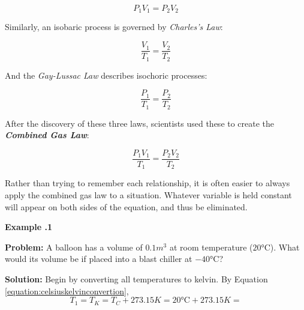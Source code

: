 	\begin{mdframed}[backgroundcolor=orange!20!white]
		\begin{equation}
			P_1 V_1 = P_2 V_2
			\label{equation:boyleslaw}
		\end{equation}
	\end{mdframed}	

Similarly, an isobaric process is governed by \textit{Charles's Law}: 
	\begin{mdframed}[backgroundcolor=orange!20!white]
	\begin{equation}
		\frac{V_1}{T_1} = \frac{V_2}{T_2}
		\label{equation:charleslaw}
	\end{equation}
\end{mdframed}	

And the \textit{Gay-Lussac Law} describes isochoric processes: 
\begin{mdframed}[backgroundcolor=orange!20!white]
	\begin{equation}
		\frac{P_1}{T_1} = \frac{P_2}{T_2}
		\label{equation:gaylussaclaw}
	\end{equation}
\end{mdframed}	

After the discovery of these three laws, scientists used these to create the \textbf{\textit{Combined Gas Law}}: 
\begin{mdframed}[backgroundcolor=orange!20!white]
	\begin{equation}
		\frac{P_1V_1}{T_1} = \frac{P_2V_2}{T_2}
		\label{equation:combinedgaslaw}
	\end{equation}
\end{mdframed}

Rather than trying to remember each relationship, it is often easier to always apply the combined gas law to a situation.  Whatever variable is held constant will appear on both sides of the equation, and thus be eliminated.  



\begin{mdframed}[backgroundcolor=blue!10!white]
	\begin{center}
		
		
		\textbf{Example \thesection.1}	
	\end{center}
	
	\textbf{Problem: }A balloon has a volume of $0.1 \si{m^3}$ at room temperature ($20\si{\degreeCelsius}$).  What would its volume be if placed into a blast chiller at $-40\si{\degreeCelsius}$?  
	
	
	\vspace{0.1in}
	
	\textbf{Solution:} Begin by converting all temperatures to kelvin. By Equation \ref{equation:celsiuskelvinconvertion},
	\begin{equation*}
		T_1 = T_K = T_C + 273.15\si{K} = 20 \si{\degreeCelsius} + 273.15\si{K} = 
	\end{equation*}
	
	
	
\end{mdframed}





